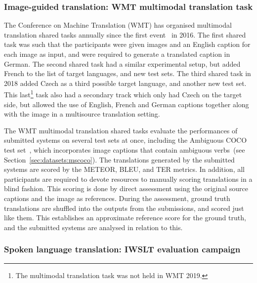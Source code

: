 \documentclass{svjour3}
\begin{document}
        \subsubsection{Image-guided translation: WMT multimodal translation task}
        \label{sec:eval:tasks:wmt}
        
            The Conference on Machine Translation (WMT) has organised multimodal translation shared tasks annually since the first event~\citep{specia-shared-2016} in 2016.
The first shared task was such that the participants were given images and an English caption for each image as input, and were required to generate a translated caption in German. The second shared task had a similar experimental setup, but added French to the list of target languages, and new test sets. The third shared task in 2018 added Czech as a third possible target language, and another new test set. This last\footnote{The multimodal translation task was not held in WMT 2019.} task also had a secondary track which only had Czech on the target side, but allowed the use of English, French and German captions together along with the image in a multisource translation setting.
            
            The WMT multimodal translation shared tasks evaluate the performances of submitted systems on several test sets at once, including the Ambiguous COCO test set~\citep{elliott-findings-2017}, which incorporates image captions that contain ambiguous verbs~(see Section~\ref{sec:datasets:mscoco}). The translations generated by the submitted systems are scored by the METEOR, BLEU, and TER metrics. In addition, all participants are required to devote resources to manually scoring translations in a blind fashion. This scoring is done by direct assessment using the original source captions and the image as references. During the assessment, ground truth translations are shuffled into the outputs from the submissions, and scored just like them. This establishes an approximate reference score for the ground truth, and the submitted systems are analysed in relation to this.
        


        \subsubsection{Spoken language translation: IWSLT evaluation campaign}
        \label{sec:eval:tasks:iwslt}
            
\end{document}
